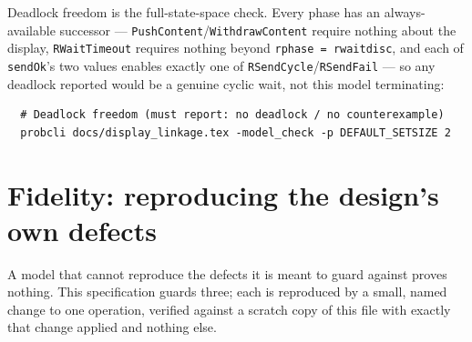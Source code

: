 \documentclass[a4paper,10pt,fleqn]{article}
\begin{document}
Deadlock freedom is the full-state-space check.  Every phase has an
always-available successor --- \texttt{PushContent}/\texttt{WithdrawContent}
require nothing about the display, \texttt{RWaitTimeout} requires nothing
beyond \texttt{rphase = rwaitdisc}, and each of \texttt{sendOk}'s two values
enables exactly one of \texttt{RSendCycle}/\texttt{RSendFail} --- so any
deadlock reported would be a genuine cyclic wait, not this model
terminating:
\begin{verbatim}
  # Deadlock freedom (must report: no deadlock / no counterexample)
  probcli docs/display_linkage.tex -model_check -p DEFAULT_SETSIZE 2
\end{verbatim}

\section{Fidelity: reproducing the design's own defects}
\label{sec:fidelity}

A model that cannot reproduce the defects it is meant to guard against
proves nothing.  This specification guards three; each is reproduced by a
small, named change to one operation, verified against a scratch copy of
this file with exactly that change applied and nothing else.
\end{document}
